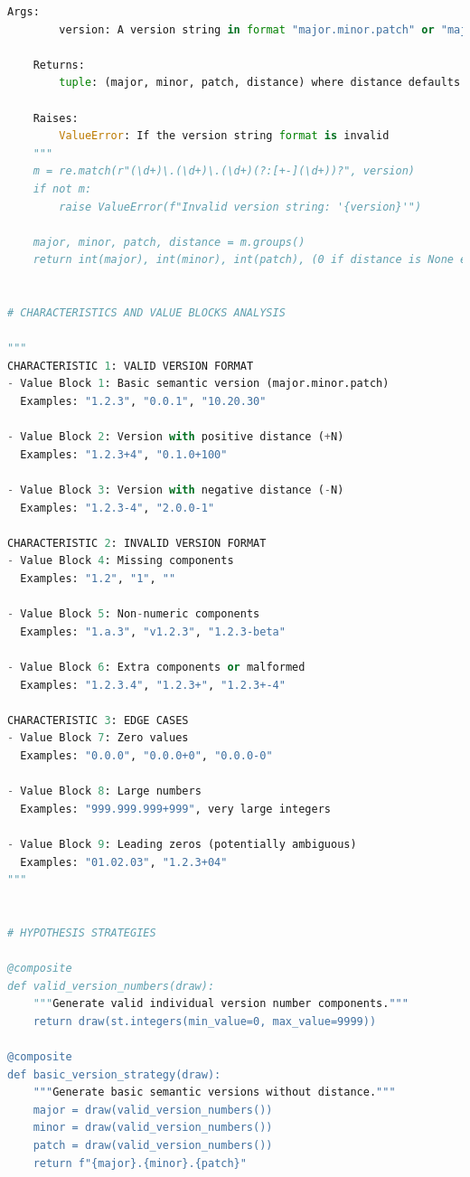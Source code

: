 \documentclass[a4paper]{scrreprt}
\begin{document}
\begin{aiTask}
\begin{answer}
\begin{lstlisting}[language=Python]
    Args:
        version: A version string in format "major.minor.patch" or "major.minor.patch+distance" or "major.minor.patch-distance"
    
    Returns:
        tuple: (major, minor, patch, distance) where distance defaults to 0 if not specified
    
    Raises:
        ValueError: If the version string format is invalid
    """
    m = re.match(r"(\d+)\.(\d+)\.(\d+)(?:[+-](\d+))?", version)
    if not m:
        raise ValueError(f"Invalid version string: '{version}'")
    
    major, minor, patch, distance = m.groups()
    return int(major), int(minor), int(patch), (0 if distance is None else int(distance))


# CHARACTERISTICS AND VALUE BLOCKS ANALYSIS

"""
CHARACTERISTIC 1: VALID VERSION FORMAT
- Value Block 1: Basic semantic version (major.minor.patch)
  Examples: "1.2.3", "0.0.1", "10.20.30"
  
- Value Block 2: Version with positive distance (+N)
  Examples: "1.2.3+4", "0.1.0+100"
  
- Value Block 3: Version with negative distance (-N)  
  Examples: "1.2.3-4", "2.0.0-1"

CHARACTERISTIC 2: INVALID VERSION FORMAT
- Value Block 4: Missing components
  Examples: "1.2", "1", ""
  
- Value Block 5: Non-numeric components
  Examples: "1.a.3", "v1.2.3", "1.2.3-beta"
  
- Value Block 6: Extra components or malformed
  Examples: "1.2.3.4", "1.2.3+", "1.2.3+-4"

CHARACTERISTIC 3: EDGE CASES
- Value Block 7: Zero values
  Examples: "0.0.0", "0.0.0+0", "0.0.0-0"
  
- Value Block 8: Large numbers
  Examples: "999.999.999+999", very large integers
  
- Value Block 9: Leading zeros (potentially ambiguous)
  Examples: "01.02.03", "1.2.3+04"
"""


# HYPOTHESIS STRATEGIES

@composite
def valid_version_numbers(draw):
    """Generate valid individual version number components."""
    return draw(st.integers(min_value=0, max_value=9999))

@composite  
def basic_version_strategy(draw):
    """Generate basic semantic versions without distance."""
    major = draw(valid_version_numbers())
    minor = draw(valid_version_numbers()) 
    patch = draw(valid_version_numbers())
    return f"{major}.{minor}.{patch}"


\end{lstlisting}
\end{answer}
\end{aiTask}
\end{document}
